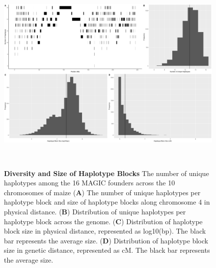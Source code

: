\documentclass[article,9pt,twocolumn,twoside]{rilabRxiv}
\begin{document}
\begin{figure}[ht]
\includegraphics[width=\textwidth,height=10cm]{figures/figure2.png}
\caption{\textbf{Diversity and Size of Haplotype Blocks} The number of unique haplotypes among the 16 MAGIC founders across the 10 chromosomes of maize (\textbf{A}) The number of unique haplotypes per haplotype block and size of haplotype blocks along chromosome 4 in physical distance. (\textbf{B}) Distribution of unique haplotypes per haplotype block across the genome. (\textbf{C}) Distribution of haplotype block size in physical distance, represented as log10(bp). The black bar represents the average size. (\textbf{D}) Distribution of haplotype block size in genetic distance, represented as cM. The black bar represents the average size.}
\label{fig:figure2}
\end{figure}
\end{document}
